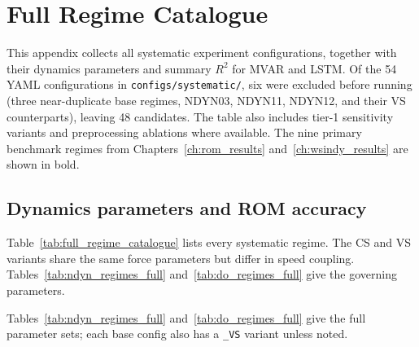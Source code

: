 \chapter{Full Regime Catalogue}
\label{app:full_regime_catalogue}

This appendix collects all systematic experiment configurations,
together with their dynamics parameters and summary
$R^2$ for MVAR and LSTM\@.  Of the 54 YAML configurations in
\texttt{configs/systematic/}, six were excluded before running
(three near-duplicate base regimes, NDYN03, NDYN11,
NDYN12, and their VS counterparts), leaving 48 candidates.
The table also includes tier-1 sensitivity variants and
preprocessing ablations where available.  The nine primary benchmark
regimes from Chapters~\ref{ch:rom_results} and~\ref{ch:wsindy_results}
are shown in bold.

\section{Dynamics parameters and ROM accuracy}
\label{sec:regime_catalogue_table}

Table~\ref{tab:full_regime_catalogue} lists every systematic regime.
The CS and VS variants share the same force parameters but differ in speed
coupling.  Tables~\ref{tab:ndyn_regimes_full} and~\ref{tab:do_regimes_full}
give the governing parameters.

\begin{table}[htbp]
\centering
\caption{Mean test $R^2$ for MVAR and LSTM across all systematic experiments.
Bold = nine main-text regimes; ---$^\dagger$ = LSTM diverged ($R^2<{-}2$).}
\label{tab:full_regime_catalogue}

\end{table}

Tables~\ref{tab:ndyn_regimes_full} and~\ref{tab:do_regimes_full} give the
full parameter sets; each base config also has a \texttt{\_VS} variant
unless noted.

